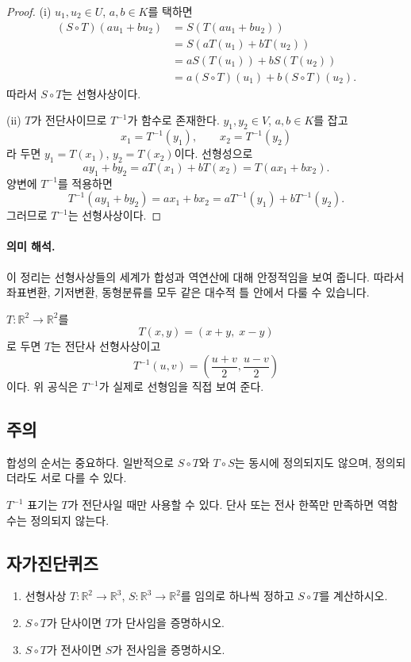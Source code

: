 \begin{proof}
(i) $u_1,u_2\in U$, $a,b\in K$를 택하면
\[
\begin{aligned}
(S\circ T)(au_1+bu_2)
&=S(T(au_1+bu_2))\\
&=S(aT(u_1)+bT(u_2))\\
&=aS(T(u_1))+bS(T(u_2))\\
&=a(S\circ T)(u_1)+b(S\circ T)(u_2).
\end{aligned}
\]
따라서 $S\circ T$는 선형사상이다.

(ii) $T$가 전단사이므로 $T^{-1}$가 함수로 존재한다. $y_1,y_2\in V$, $a,b\in K$를 잡고
\[
x_1=T^{-1}(y_1),\qquad x_2=T^{-1}(y_2)
\]
라 두면 $y_1=T(x_1)$, $y_2=T(x_2)$이다. 선형성으로
\[
ay_1+by_2=aT(x_1)+bT(x_2)=T(ax_1+bx_2).
\]
양변에 $T^{-1}$를 적용하면
\[
T^{-1}(ay_1+by_2)=ax_1+bx_2
=aT^{-1}(y_1)+bT^{-1}(y_2).
\]
그러므로 $T^{-1}$는 선형사상이다.
\end{proof}

\paragraph{의미 해석.}
이 정리는 선형사상들의 세계가 합성과 역연산에 대해 안정적임을 보여 줍니다. 따라서 좌표변환, 기저변환, 동형분류를 모두 같은 대수적 틀 안에서 다룰 수 있습니다.

\begin{example}
$T:\mathbb{R}^2\to\mathbb{R}^2$를
\[
T(x,y)=(x+y,\;x-y)
\]
로 두면 $T$는 전단사 선형사상이고
\[
T^{-1}(u,v)=\left(\frac{u+v}{2},\frac{u-v}{2}\right)
\]
이다. 위 공식은 $T^{-1}$가 실제로 선형임을 직접 보여 준다.
\end{example}

\subsection*{주의}
\begin{warning}
합성의 순서는 중요하다. 일반적으로 $S\circ T$와 $T\circ S$는 동시에 정의되지도 않으며, 정의되더라도 서로 다를 수 있다.
\end{warning}
\begin{warning}
$T^{-1}$ 표기는 $T$가 전단사일 때만 사용할 수 있다. 단사 또는 전사 한쪽만 만족하면 역함수는 정의되지 않는다.
\end{warning}

\subsection*{자가진단퀴즈}
\begin{enumerate}[label=\arabic*.]
\item 선형사상 $T:\mathbb{R}^2\to\mathbb{R}^3$, $S:\mathbb{R}^3\to\mathbb{R}^2$를 임의로 하나씩 정하고 $S\circ T$를 계산하시오.
\item $S\circ T$가 단사이면 $T$가 단사임을 증명하시오.
\item $S\circ T$가 전사이면 $S$가 전사임을 증명하시오.
\end{enumerate}

